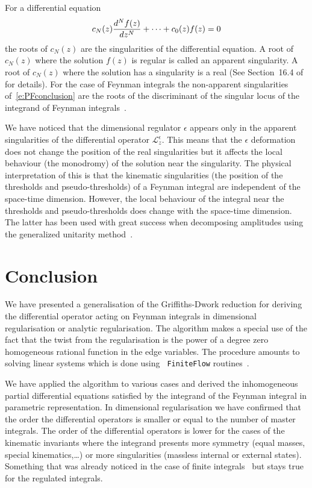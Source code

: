\documentclass[a4paper,12pt]{article}
\numberwithin{equation}{section}
\numberwithin{figure}{section}
\begin{document}
%
For a differential equation
\begin{equation}\label{e:PFconclusion}
c_N(z)  {d^Nf(z)\over dz^N}+\cdots + c_0(z) f(z)=0
\end{equation}
the roots of $c_N(z)$ are the singularities of the differential
equation. A root of $c_N(z)$ where the solution $f(z)$ is
regular is called an apparent singularity. A root of $c_N(z)$
where the solution has a singularity is a real (See 
Section~16.4 of~\cite{Ince} for details). 
%
For the case of Feynman integrals the non-apparent singularities
of~\eqref{e:PFconclusion} are the roots of the
discriminant of the singular locus of the integrand of  Feynman
integrals~\cite{Doran:2023yzu}.

We have noticed that the dimensional regulator $\epsilon$ appears only in  the
apparent singularities of the differential operator
$\mathscr{L}_z^\epsilon$. This means that the  $\epsilon$ deformation
does not change the position of the real singularities but it affects
the local behaviour (the monodromy) of the solution near the
singularity.
%
The physical interpretation of this is that the kinematic
singularities (the position of the thresholds
and pseudo-thresholds) of a Feynman integral are independent of the
space-time dimension. However,  the local behaviour of the integral near
the thresholds and pseudo-thresholds does change with the space-time
dimension. The latter has been used with great success
when decomposing amplitudes using the generalized unitarity method~\cite{Bern:2011qt}.

\section{Conclusion}\label{sec:conclusion}
We have presented a generalisation of the Griffiths-Dwork reduction
for deriving the differential operator acting on Feynman integrals in
dimensional regularisation or analytic regularisation. The algorithm
makes a special use of the fact that the twist from the regularisation
is the power of a degree zero homogeneous rational function in the
edge variables. The procedure amounts to
solving linear systems which is done using {\tt
  FiniteFlow} routines~\cite{Peraro:2019svx}.

We have applied the algorithm to various cases and derived the
inhomogeneous partial differential equations satisfied by the integrand of the Feynman integral in parametric representation.
In dimensional regularisation we have confirmed that the order the
differential operators is smaller or equal to the number of master
integrals. The order of the differential operators is lower for the cases of the kinematic invariants where the integrand
presents more symmetry (equal masses, special kinematics,\dots) or
more singularities (massless internal or external states). Something
that was already noticed in the case of finite integrals~\cite{Lairez:2022zkj}  but stays
true for the regulated integrals.
\end{document}
